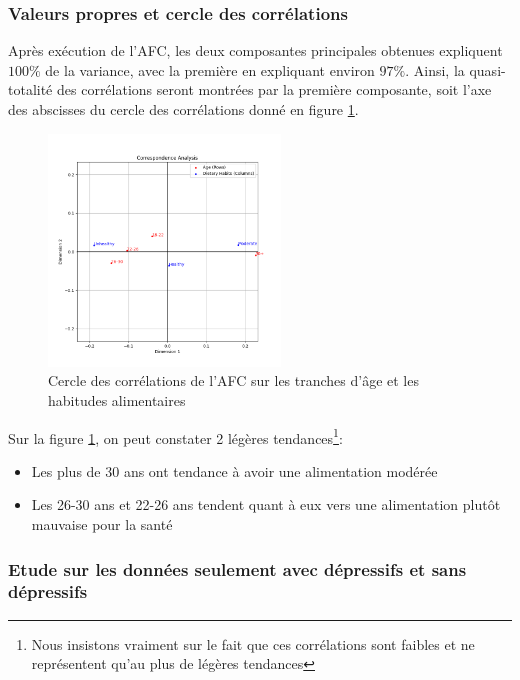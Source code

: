 \subsubsection{Valeurs propres et cercle des corrélations}

Après exécution de l'AFC, les deux composantes principales obtenues expliquent $100\%$ de la variance, avec la première en expliquant environ $97\%$.
Ainsi, la quasi-totalité des corrélations seront montrées par la première composante, soit l'axe des abscisses du cercle des corrélations donné en figure \ref{fig:corrAgeDietary}.

\begin{figure}[!h]
  \begin{center}
    \includegraphics[width=0.55\textwidth]{Images/Age_Dietary_all/Corr_circle.png}
  \end{center}
  \caption{Cercle des corrélations de l'AFC sur les tranches d'âge et les habitudes alimentaires}
  \label{fig:corrAgeDietary}
\end{figure}

Sur la figure \ref{fig:corrAgeDietary}, on peut constater 2 légères tendances\footnote{Nous insistons vraiment sur le fait que ces corrélations sont faibles et ne représentent qu'au plus de légères tendances}:
\begin{itemize}
  \item Les plus de 30 ans ont tendance à avoir une alimentation modérée 
  \item Les 26-30 ans et 22-26 ans tendent quant à eux vers une alimentation plutôt mauvaise pour la santé
\end{itemize}

\subsubsection{Etude sur les données seulement avec dépressifs et sans dépressifs}

